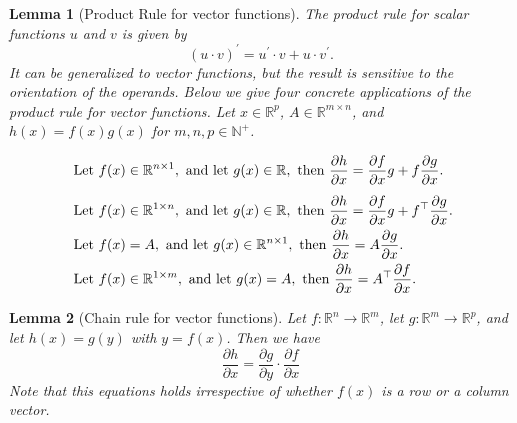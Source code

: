 \documentclass[twoside,11pt]{article}
\newtheorem{lemma}{Lemma}
\newcommand{\Derivative}[2]{\ensuremath{\frac{\partial #1}{\partial #2}}}
\newcommand{\Reals}{\mathbb{R}}
\begin{document}
\begin{lemma}[Product Rule for vector functions] \label{lemma:product-rule}
The product rule for scalar functions $u$ and $v$ is given by
\[
(u \cdot v)^{\prime} = u^{\prime} \cdot v + u \cdot v^{\prime}.
\]
It can be generalized to vector functions, but the result is sensitive to the orientation of the operands. Below we give four concrete applications of the product rule for vector functions.
Let $x \in \Reals^{p}$, $A \in \Reals^{m \times n}$, and $h(x) = f(x) g(x)$ for $m, n, p \in \mathbb{N}^{+}$.
\begin{table}[h]
\begin{alignat}{2}
&
\text{ Let } f(x) \in \Reals^{n \times 1},
\text{ and let } g(x) \in \Reals, 
\text{ then }
\Derivative{h}{x} = \Derivative{f}{x} g + f \Derivative{g}{x}.
\label{eq:product-rule1}
\\ \addlinespace[1ex]
&
\text{ Let } f(x) \in \Reals^{1 \times n},
\text{ and let } g(x) \in \Reals,
\text{ then }
\Derivative{h}{x} = \Derivative{f}{x} g + f^\top \Derivative{g}{x}.
\label{eq:product-rule2}
\\
&
\text{ Let } f(x) = A,
\text{ and let } g(x) \in \Reals^{n \times 1},
\text{ then }
\Derivative{h}{x} = A \Derivative{g}{x}.
\label{eq:product-rule3}
\\
&
\text{ Let } f(x) \in \Reals^{1 \times m},
\text{ and let } g(x) = A,
\text{ then }
\Derivative{h}{x} = A^\top \Derivative{f}{x}.
\label{eq:product-rule4}
\end{alignat}
\label{table:product-rule}
\end{table}
\end{lemma}

\begin{lemma}[Chain rule for vector functions] \label{lemma:chain-rule}
    Let $f: \Reals^n \rightarrow \Reals^m$, let 
    $g: \Reals^m \rightarrow \Reals^p$,
    and let $h(x) = g(y)$ with $y = f(x)$. Then we have
    \begin{equation} \label{eq:chain-rule}
       \frac{\partial h}{\partial x} = 
       \frac{\partial g}{\partial y} \cdot
       \frac{\partial f}{\partial x}
    \end{equation}
    Note that this equations holds irrespective of whether $f(x)$ is a row or a column vector.
\end{lemma}
\vspace{0.3cm}
\end{document}
